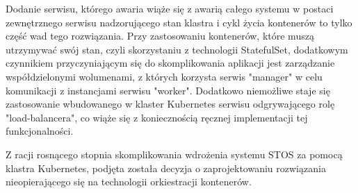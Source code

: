 Dodanie serwisu, którego awaria wiąże się z awarią całego systemu w postaci zewnętrznego serwisu nadzorującego stan klastra i cykl życia kontenerów to tylko część wad tego rozwiązania. Przy zastosowaniu kontenerów, które muszą utrzymywać swój stan, czyli skorzystaniu z technologii StatefulSet, dodatkowym czynnikiem przyczyniającym się do skomplikowania aplikacji jest zarządzanie współdzielonymi wolumenami, z których korzysta serwis "manager" w celu komunikacji z instancjami serwisu "worker". Dodatkowo niemożliwe staje się zastosowanie wbudowanego w klaster Kubernetes serwisu odgrywającego rolę "load-balancera", co wiąże się z koniecznością ręcznej implementacji tej funkcjonalności.

Z racji rosnącego stopnia skomplikowania wdrożenia systemu STOS za pomocą klastra Kubernetes, podjęta została decyzja o zaprojektowaniu rozwiązania nieopierającego się na technologii orkiestracji kontenerów.
